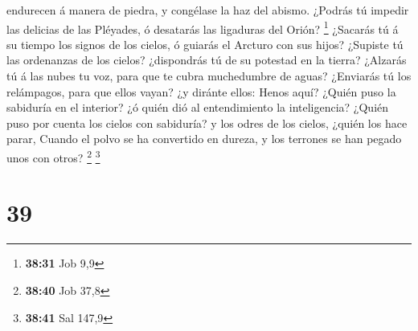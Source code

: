 endurecen á manera de piedra, y congélase la haz del abismo.
 ¿Podrás tú impedir las delicias de las Pléyades, ó
desatarás las ligaduras del Orión? \footnote{\textbf{38:31} Job 9,9}
 ¿Sacarás tú á su tiempo los signos de los cielos, ó
guiarás el Arcturo con sus hijos?  ¿Supiste tú las
ordenanzas de los cielos? ¿dispondrás tú de su potestad en la tierra?
 ¿Alzarás tú á las nubes tu voz, para que te cubra
muchedumbre de aguas?  ¿Enviarás tú los relámpagos, para
que ellos vayan? ¿y diránte ellos: Henos aquí?  ¿Quién
puso la sabiduría en el interior? ¿ó quién dió al entendimiento la
inteligencia?  ¿Quién puso por cuenta los cielos con
sabiduría? y los odres de los cielos, ¿quién los hace parar,
 Cuando el polvo se ha convertido en dureza, y los
terrones se han pegado unos con otros?  
\footnote{\textbf{38:40} Job 37,8}  \footnote{\textbf{38:41}
  Sal 147,9}

\hypertarget{section-38}{%
\section{39}\label{section-38}}

